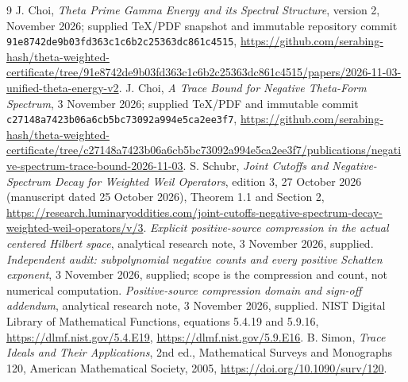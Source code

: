 \documentclass[11pt]{article}
\begin{document}
\begin{thebibliography}{9}
 J. Choi, \emph{Theta Prime Gamma Energy and its Spectral Structure}, version 2, November 2026; supplied TeX/PDF snapshot and immutable repository commit \texttt{91e8742de9b03fd363c1c6b2c25363dc861c4515}, \url{https://github.com/serabing-hash/theta-weighted-certificate/tree/91e8742de9b03fd363c1c6b2c25363dc861c4515/papers/2026-11-03-unified-theta-energy-v2}.
 J. Choi, \emph{A Trace Bound for Negative Theta-Form Spectrum}, 3 November 2026; supplied TeX/PDF and immutable commit \texttt{c27148a7423b06a6cb5bc73092a994e5ca2ee3f7}, \url{https://github.com/serabing-hash/theta-weighted-certificate/tree/c27148a7423b06a6cb5bc73092a994e5ca2ee3f7/publications/negative-spectrum-trace-bound-2026-11-03}.
 S. Schubr, \emph{Joint Cutoffs and Negative-Spectrum Decay for Weighted Weil Operators}, edition 3, 27 October 2026 (manuscript dated 25 October 2026), Theorem 1.1 and Section 2, \url{https://research.luminaryoddities.com/joint-cutoffs-negative-spectrum-decay-weighted-weil-operators/v/3}.
 \emph{Explicit positive-source compression in the actual centered Hilbert space}, analytical research note, 3 November 2026, supplied.
 \emph{Independent audit: subpolynomial negative counts and every positive Schatten exponent}, 3 November 2026, supplied; scope is the compression and count, not numerical computation.
 \emph{Positive-source compression domain and sign-off addendum}, analytical research note, 3 November 2026, supplied.
 NIST Digital Library of Mathematical Functions, equations 5.4.19 and 5.9.16, \url{https://dlmf.nist.gov/5.4.E19}, \url{https://dlmf.nist.gov/5.9.E16}.
 B. Simon, \emph{Trace Ideals and Their Applications}, 2nd ed., Mathematical Surveys and Monographs 120, American Mathematical Society, 2005, \url{https://doi.org/10.1090/surv/120}.
\end{thebibliography}
\end{document}
